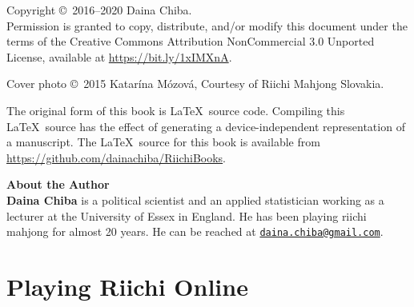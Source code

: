 \documentclass{book}
\begin{document}
\pagebreak
\thispagestyle{empty}

\noindent
{\small
Copyright \copyright ~2016--2020 Daina Chiba.\\
Permission is granted to copy, distribute, and/or modify this document
under the terms of the Creative Commons Attribution NonCommercial 3.0 Unported License, available at \url{https://bit.ly/1xIMXnA}.

\vspace{.2in}
\noindent
Cover photo \copyright ~2015 Katar\'{i}na M\'{o}zov\'{a}, Courtesy of Riichi Mahjong Slovakia. 

\vspace{.2in}

\noindent
The original form of this book is \LaTeX\ source code.  Compiling this
\LaTeX\ source has the effect of generating a device-independent
representation of a manuscript. The \LaTeX\ source for this book is available from 
\url{https://github.com/dainachiba/RiichiBooks}.

\vfill
\noindent
{\large\bf About the Author}\\

\noindent
{\bf Daina Chiba} is a political scientist and an applied statistician working as a lecturer at the University of Essex in England. 
He has been playing riichi mahjong for almost 20 years. 
He can be reached at \href{mailto:daina.chiba@gmail.com}{\tt daina.chiba@gmail.com}.
} %


\pagebreak

\thispagestyle{empty}
\mbox{}\newpage
\thispagestyle{empty}
\mbox{}\newpage

\let\cleardoublepage\clearpage




{
	\tableofcontents
}

\newpage

\mainmatter

\pagebreak
\thispagestyle{empty}
\mbox{}\newpage
\thispagestyle{empty}
\mbox{}\newpage


\part{Playing Riichi Online} \label{part:online}
\end{document}
